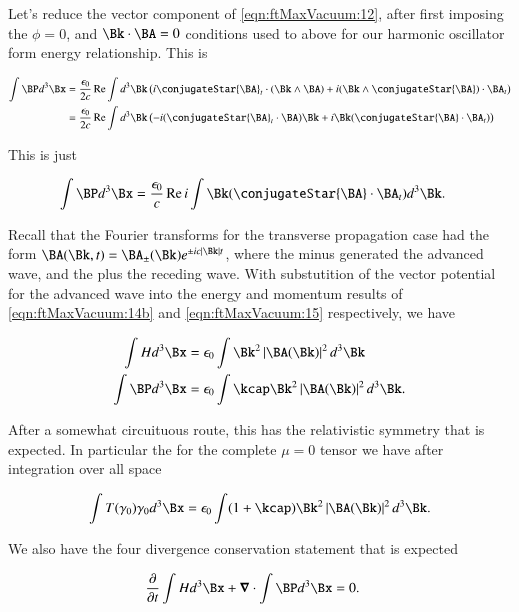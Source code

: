 Let's reduce the vector component of \autoref{eqn:ftMaxVacuum:12}, after first imposing the $\phi=0$, and $\Bk \cdot \BA = 0$ conditions used to above for our harmonic oscillator form energy relationship.  This is

\begin{align*}
\int \BP d^3 \Bx 
&=
\frac{\epsilon_0}{2 c} \Real 
\int d^3 \Bk \left( 
i \conjugateStar{\BA}_t \cdot (\Bk \wedge \BA)
+ i (\Bk \wedge \conjugateStar{\BA}) \cdot \BA_t
\right) \\
&=
\frac{\epsilon_0}{2 c} \Real 
\int d^3 \Bk \left( 
-i (\conjugateStar{\BA}_t \cdot \BA) \Bk
+ i \Bk (\conjugateStar{\BA} \cdot \BA_t)
\right)
\end{align*}

This is just

\begin{align}
\label{eqn:ftMaxVacuum:15}
\int \BP d^3 \Bx 
&=
\frac{\epsilon_0}{c} \Real 
i \int 
\Bk (\conjugateStar{\BA} \cdot \BA_t) d^3 \Bk.
\end{align}

Recall that the Fourier transforms for the transverse propagation case had the form $\BA(\Bk, t) = \BA_{\pm}(\Bk) e^{\pm i c \Abs{\Bk} t}$, where the minus generated the advanced wave, and the plus the receding wave.  With substutition of the vector potential for the advanced wave into the energy and momentum results of \autoref{eqn:ftMaxVacuum:14b} and \autoref{eqn:ftMaxVacuum:15} respectively, we have

\begin{align}\label{eqn:ftMaxVacuum:80}
\int H d^3 \Bx   &= \epsilon_0 \int \Bk^2 \Abs{\BA(\Bk)}^2 d^3 \Bk \\
\int \BP d^3 \Bx &= \epsilon_0 \int \kcap \Bk^2 \Abs{\BA(\Bk)}^2 d^3 \Bk.
\end{align}

After a somewhat circuituous route, this has the relativistic symmetry that is expected.  In particular the for the complete $\mu=0$ tensor we have after integration over all space

\begin{align}\label{eqn:ftMaxVacuum:81}
\int 
T(\gamma_0) \gamma_0 d^3 \Bx = \epsilon_0 \int (1 + \kcap) \Bk^2 \Abs{\BA(\Bk)}^2 d^3 \Bk.
\end{align}

We also have the four divergence conservation statement that is expected

\begin{align}\label{eqn:ftMaxVacuum:82}
\PD{t}{} \int H d^3 \Bx + \spacegrad \cdot \int \BP d^3 \Bx &= 0.
\end{align}

